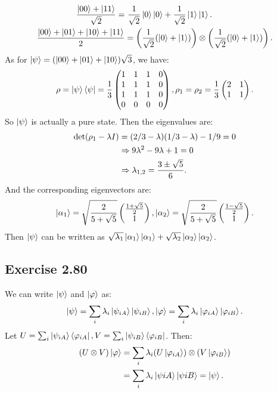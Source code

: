 \begin{align}
\frac{\ket{00}+\ket{11}}{\sqrt{2}}=&~\frac{1}{\sqrt{2}}\ket{0}\ket{0}+\frac{1}{\sqrt{2}}\ket{1}\ket{1}.\\
\frac{\ket{00}+\ket{01}+\ket{10}+\ket{11}}{2}&=\left(\frac{1}{\sqrt{2}}(\ket{0}+\ket{1})\right)\otimes\left(\frac{1}{\sqrt{2}}(\ket{0}+\ket{1})\right).
\end{align}
As for $\ket{\psi}=(\ket{00}+\ket{01}+\ket{10})\sqrt{3}$, we have:
\begin{align}
\rho = \ket{\psi}\bra{\psi}=\frac{1}{3}\begin{pmatrix}
1&1&1&0\\1&1&1&0\\1&1&1&0\\0&0&0&0
\end{pmatrix},
\rho_1=\rho_2 =
\frac{1}{3}\begin{pmatrix}
2&1\\1&1
\end{pmatrix}.
\end{align}
So $\ket{\psi}$ is actually a pure state. Then the eigenvalues are: 
\begin{align}
    {\rm det}(\rho_1-\lambda I)&=(2/3-\lambda)(1/3-\lambda)-1/9=0\\
&\Rightarrow 9\lambda^2-9\lambda +1 =0\\
&\Rightarrow \lambda_{1,2} = \frac{3\pm\sqrt{5}}{6}.
\end{align}
And the corresponding eigenvectors are:
\begin{align}
\ket{\alpha_1} =\sqrt{\frac{2}{5+\sqrt{5}}}\begin{pmatrix}
\frac{1+\sqrt{5}}{2} \\ 1
\end{pmatrix},\ket{\alpha_2} =\sqrt{\frac{2}{5+\sqrt{5}}}\begin{pmatrix}
\frac{1-\sqrt{5}}{2} \\ 1
\end{pmatrix}.
\end{align}
Then $\ket{\psi}$ can be written as $\sqrt{\lambda_1} \ket{\alpha_1}\ket{\alpha_1}+\sqrt{\lambda_2}\ket{\alpha_2}\ket{\alpha_2}$.

\subsection*{Exercise 2.80}

We can write $\ket{\psi}$ and $\ket{\varphi}$ as:
\begin{align}
\ket{\psi}=\sum_i\lambda_i \ket{\psi_{iA}}\ket{\psi_{iB}},
\ket{\varphi}=\sum_i\lambda_i \ket{\varphi_{iA}}\ket{\varphi_{iB}}.
\end{align}
Let $U=\sum_i \ket{\psi_{iA}}\bra{\varphi_{iA}},V=\sum_i \ket{\psi_{iB}}\bra{\varphi_{iB}}$. Then:
\begin{align}
(U\otimes V)\ket{\varphi}&=\sum_i\lambda_i (U\ket{\varphi_{iA}})\otimes(V\ket{\varphi_{iB}})\\
&=\sum_i\lambda_i\ket{\psi{iA}}\ket{\psi{iB}}=\ket{\psi}.
\end{align}

